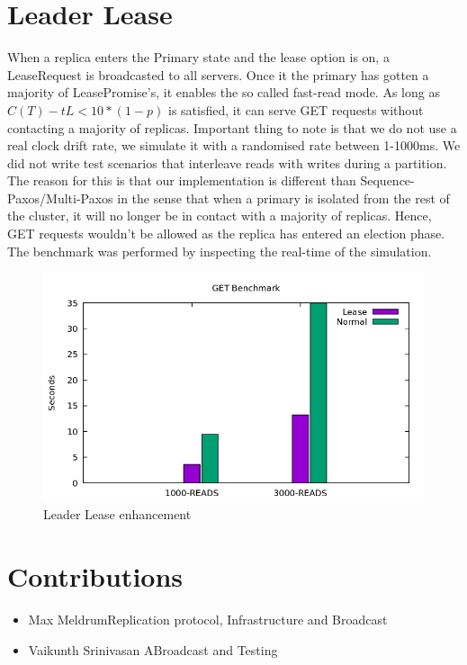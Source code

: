 \documentclass[12pt]{article}
\begin{document}
\section{Leader Lease}
When a replica enters the Primary state and the lease option is on, a LeaseRequest is broadcasted to all servers. Once it the primary has gotten a majority of LeasePromise's, it enables the so called fast-read mode. As long as \(C(T) - tL < 10*(1-p)\) is satisfied, it can serve GET requests without contacting a majority of replicas. Important thing to note is that we do not use a real clock drift rate, we simulate it with a randomised rate between 1-1000ms.
\newline{}\newline{}
We did not write test scenarios that interleave reads with writes during a partition. The reason for this is that our implementation is different than Sequence-Paxos/Multi-Paxos in the sense that when a primary is isolated from the rest of the cluster, it will no longer be in contact with a majority of replicas. Hence, GET requests wouldn't be allowed as the replica has entered an election phase. The benchmark was performed by inspecting the real-time of the simulation.
\begin{figure}[H]
  \centering
  \includegraphics[scale=0.5]{img/benchmark.png}
  \caption[Caption for LOF]{Leader Lease enhancement}  
  \label{fig:picture}
\end{figure}

\section{Contributions}

\begin{itemize}
	\item{Max Meldrum\newline{}\newline{}Replication protocol, Infrastructure and Broadcast}
	\item{Vaikunth Srinivasan A\newline{}\newline{}Broadcast and Testing}

\end{itemize}


\end{document}
